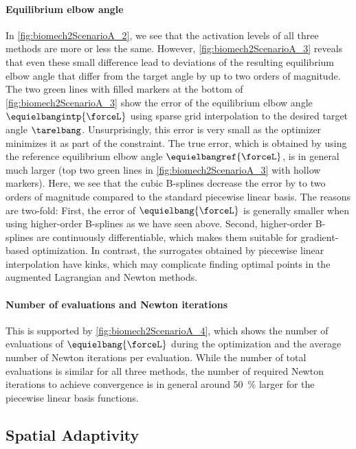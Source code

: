 \paragraph{Equilibrium elbow angle}

In \cref{fig:biomech2ScenarioA_2}, we see that the activation levels
of all three methods are more or less the same.
However, \cref{fig:biomech2ScenarioA_3} reveals that even these small
difference lead to deviations of the resulting equilibrium elbow angle
that differ from the target angle by up to two orders of magnitude.
The two green lines with filled markers at the bottom of
\cref{fig:biomech2ScenarioA_3} show the error of
the equilibrium elbow angle $\equielbangintp{\forceL}$
using sparse grid interpolation to the desired target angle $\tarelbang$.
Unsurprisingly, this error is very small as the optimizer minimizes it
as part of the constraint.
The true error, which is obtained by
using the reference equilibrium elbow angle $\equielbangref{\forceL}$,
is in general much larger
(top two green lines in \cref{fig:biomech2ScenarioA_3}
with hollow markers).
Here, we see that the cubic B-splines decrease the error
by to two orders of magnitude compared to the
standard piecewise linear basis.
The reasons are two-fold:
First, the error of $\equielbang{\forceL}$ is generally smaller
when using higher-order B-splines as we have seen above.
Second, higher-order B-splines are continuously differentiable,
which makes them suitable for gradient-based optimization.
In contrast, the surrogates obtained by piecewise linear interpolation
have kinks, which may complicate finding optimal points
in the augmented Lagrangian and Newton methods.

\paragraph{Number of evaluations and Newton iterations}

This is supported by \cref{fig:biomech2ScenarioA_4},
which shows the number of evaluations of $\equielbang{\forceL}$
during the optimization and the average number of Newton iterations
per evaluation.
While the number of total evaluations is similar for all three methods,
the number of required Newton iterations to achieve convergence
is in general around \SI{50}{\percent} larger for the piecewise linear
basis functions.



\subsection{Spatial Adaptivity}
\label{sec:734adaptivity}

\dummytext[6]{}
